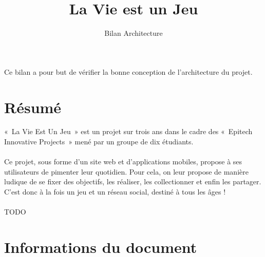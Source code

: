 \documentclass{life-fr}
\begin{document}
\title{La Vie est un Jeu}
\subtitle{Bilan Architecture}

\summary
{
  Ce bilan a pour but de vérifier la bonne conception de l’architecture
  du projet.
}

\maketitle
\authorspage


\chapter*{Résumé}
{
  «~La Vie Est Un Jeu~» est un projet sur trois ans dans le cadre des «~Epitech
  Innovative Projects~» mené par un groupe de dix étudiants.\\
  \\
  Ce projet, sous forme d'un site web et d'applications mobiles, propose à
  ses utilisateurs de pimenter leur quotidien. Pour cela, on leur propose
  de manière ludique de se fixer des objectifs, les réaliser, les collectionner
  et enfin les partager.\\
  C'est donc à la fois un jeu et un réseau social, destiné à tous les âges !\\
  \\
  TODO
}

\chapter*{Informations du document}
\end{document}
